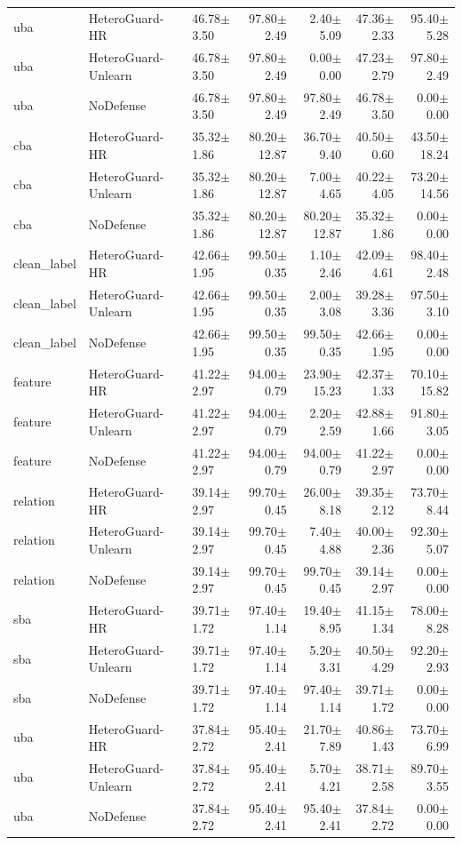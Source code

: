 \begin{table}[t]
\begin{tabular}{lllrrrr}
uba & HeteroGuard-HR & 46.78$\pm$3.50 & 97.80$\pm$2.49 & 2.40$\pm$5.09 & 47.36$\pm$2.33 & 95.40$\pm$5.28 \\
uba & HeteroGuard-Unlearn & 46.78$\pm$3.50 & 97.80$\pm$2.49 & 0.00$\pm$0.00 & 47.23$\pm$2.79 & 97.80$\pm$2.49 \\
uba & NoDefense & 46.78$\pm$3.50 & 97.80$\pm$2.49 & 97.80$\pm$2.49 & 46.78$\pm$3.50 & 0.00$\pm$0.00 \\
cba & HeteroGuard-HR & 35.32$\pm$1.86 & 80.20$\pm$12.87 & 36.70$\pm$9.40 & 40.50$\pm$0.60 & 43.50$\pm$18.24 \\
cba & HeteroGuard-Unlearn & 35.32$\pm$1.86 & 80.20$\pm$12.87 & 7.00$\pm$4.65 & 40.22$\pm$4.05 & 73.20$\pm$14.56 \\
cba & NoDefense & 35.32$\pm$1.86 & 80.20$\pm$12.87 & 80.20$\pm$12.87 & 35.32$\pm$1.86 & 0.00$\pm$0.00 \\
clean_label & HeteroGuard-HR & 42.66$\pm$1.95 & 99.50$\pm$0.35 & 1.10$\pm$2.46 & 42.09$\pm$4.61 & 98.40$\pm$2.48 \\
clean_label & HeteroGuard-Unlearn & 42.66$\pm$1.95 & 99.50$\pm$0.35 & 2.00$\pm$3.08 & 39.28$\pm$3.36 & 97.50$\pm$3.10 \\
clean_label & NoDefense & 42.66$\pm$1.95 & 99.50$\pm$0.35 & 99.50$\pm$0.35 & 42.66$\pm$1.95 & 0.00$\pm$0.00 \\
feature & HeteroGuard-HR & 41.22$\pm$2.97 & 94.00$\pm$0.79 & 23.90$\pm$15.23 & 42.37$\pm$1.33 & 70.10$\pm$15.82 \\
feature & HeteroGuard-Unlearn & 41.22$\pm$2.97 & 94.00$\pm$0.79 & 2.20$\pm$2.59 & 42.88$\pm$1.66 & 91.80$\pm$3.05 \\
feature & NoDefense & 41.22$\pm$2.97 & 94.00$\pm$0.79 & 94.00$\pm$0.79 & 41.22$\pm$2.97 & 0.00$\pm$0.00 \\
relation & HeteroGuard-HR & 39.14$\pm$2.97 & 99.70$\pm$0.45 & 26.00$\pm$8.18 & 39.35$\pm$2.12 & 73.70$\pm$8.44 \\
relation & HeteroGuard-Unlearn & 39.14$\pm$2.97 & 99.70$\pm$0.45 & 7.40$\pm$4.88 & 40.00$\pm$2.36 & 92.30$\pm$5.07 \\
relation & NoDefense & 39.14$\pm$2.97 & 99.70$\pm$0.45 & 99.70$\pm$0.45 & 39.14$\pm$2.97 & 0.00$\pm$0.00 \\
sba & HeteroGuard-HR & 39.71$\pm$1.72 & 97.40$\pm$1.14 & 19.40$\pm$8.95 & 41.15$\pm$1.34 & 78.00$\pm$8.28 \\
sba & HeteroGuard-Unlearn & 39.71$\pm$1.72 & 97.40$\pm$1.14 & 5.20$\pm$3.31 & 40.50$\pm$4.29 & 92.20$\pm$2.93 \\
sba & NoDefense & 39.71$\pm$1.72 & 97.40$\pm$1.14 & 97.40$\pm$1.14 & 39.71$\pm$1.72 & 0.00$\pm$0.00 \\
uba & HeteroGuard-HR & 37.84$\pm$2.72 & 95.40$\pm$2.41 & 21.70$\pm$7.89 & 40.86$\pm$1.43 & 73.70$\pm$6.99 \\
uba & HeteroGuard-Unlearn & 37.84$\pm$2.72 & 95.40$\pm$2.41 & 5.70$\pm$4.21 & 38.71$\pm$2.58 & 89.70$\pm$3.55 \\
uba & NoDefense & 37.84$\pm$2.72 & 95.40$\pm$2.41 & 95.40$\pm$2.41 & 37.84$\pm$2.72 & 0.00$\pm$0.00 \\
\bottomrule
\end{tabular}
\end{table}
